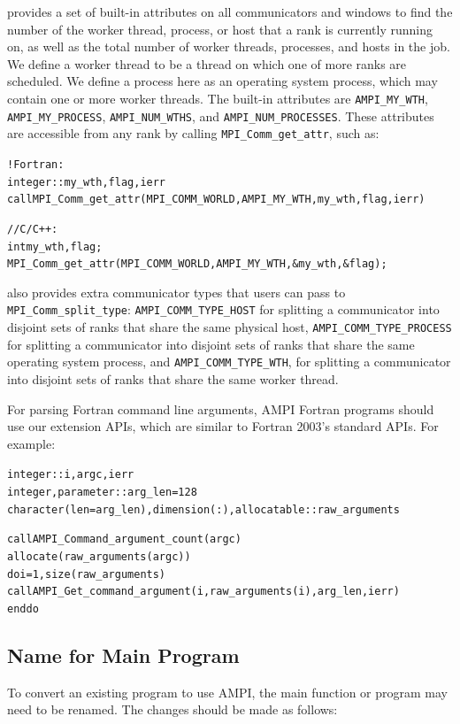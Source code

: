 \documentclass[10pt]{article}
\begin{document}
\ampi{} provides a set of built-in attributes on all communicators and windows
to find the number of the worker thread, process, or host that a rank is currently running on,
as well as the total number of worker threads, processes, and hosts in the job.
We define a worker thread to be a thread on which one of more \ampi{} ranks are scheduled.
We define a process here as an operating system process, which may contain one or more
worker threads. The built-in attributes are \texttt{AMPI\_MY\_WTH}, \texttt{AMPI\_MY\_PROCESS},
\texttt{AMPI\_NUM\_WTHS}, and \texttt{AMPI\_NUM\_PROCESSES}. These attributes are
accessible from any rank by calling \texttt{MPI\_Comm\_get\_attr}, such as:

\begin{alltt}
! Fortran:
integer :: my_wth, flag, ierr
call MPI_Comm_get_attr(MPI_COMM_WORLD, AMPI_MY_WTH, my_wth, flag, ierr)

// C/C++:
int my_wth, flag;
MPI_Comm_get_attr(MPI_COMM_WORLD, AMPI_MY_WTH, &my_wth, &flag);
\end{alltt}

\ampi{} also provides extra communicator types that users can pass to
\texttt{MPI\_Comm\_split\_type}: \texttt{AMPI\_COMM\_TYPE\_HOST} for splitting a communicator into
disjoint sets of ranks that share the same physical host, \texttt{AMPI\_COMM\_TYPE\_PROCESS} for
splitting a communicator into disjoint sets of ranks that share the same operating system process,
and \texttt{AMPI\_COMM\_TYPE\_WTH}, for splitting a communicator into disjoint sets
of ranks that share the same worker thread.

For parsing Fortran command line arguments, AMPI Fortran programs should use
our extension APIs, which are similar to Fortran 2003's standard APIs. For example:

\begin{alltt}
integer :: i, argc, ierr
integer, parameter :: arg_len = 128
character(len=arg_len), dimension(:), allocatable :: raw_arguments

call AMPI_Command_argument_count(argc)
allocate(raw_arguments(argc))
do i = 1, size(raw_arguments)
    call AMPI_Get_command_argument(i, raw_arguments(i), arg_len, ierr)
end do
\end{alltt}

\subsection{Name for Main Program}

To convert an existing program to use AMPI, the main function or program
may need to be renamed. The changes should be made as follows:
\end{document}
